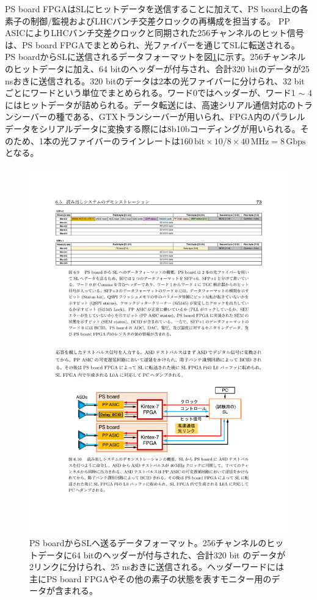     PS board FPGAはSLにヒットデータを送信することに加えて、PS board上の各素子の制御/監視およびLHCバンチ交差クロックの再構成を担当する。
    PP ASICによりLHCバンチ交差クロックと同期された256チャンネルのヒット信号は、PS board FPGAでまとめられ、光ファイバーを通じてSLに転送される。
    PS boardからSLに送信されるデータフォーマットを図\ref{TGC_PSBuplink}に示す。256チャンネルのヒットデータに加え、64 bitのヘッダーが付与され、合計320 bitのデータが25 nsおきに送信される。320 bitのデータは2本の光ファイバーに分けられ、32 bitごとにワードという単位でまとめられる。ワード0ではヘッダーが、ワード1 $\sim$ 4にはヒットデータが詰められる。データ転送には、高速シリアル通信対応のトランシーバーの種である、GTXトランシーバーが用いられ、FPGA内のパラレルデータをシリアルデータに変換する際には8b10bコーディングが用いられる。そのため、1本の光ファイバーのラインレートは$160 \, \mathrm{bit} \times 10/8 \times 40 \mathrm{\,MHz} = 8 \,\mathrm{Gbps}$となる。

    \begin{figure} 
    \centering
    \includegraphics[width=16cm]{fig/Intro/TGC_PSBuplink.pdf}
    \caption[PS boardからSLへ送るデータフォーマット]{PS boardからSLへ送るデータフォーマット\cite{mt_aoki}。256チャンネルのヒットデータに64 bitのヘッダーが付与された、合計320 bit のデータが2リンクに分けられ、25 nsおきに送信される。ヘッダーワードには主にPS board FPGAやその他の素子の状態を表すモニター用のデータが含まれる。}
    \label{TGC_PSBuplink}
    \end{figure}


